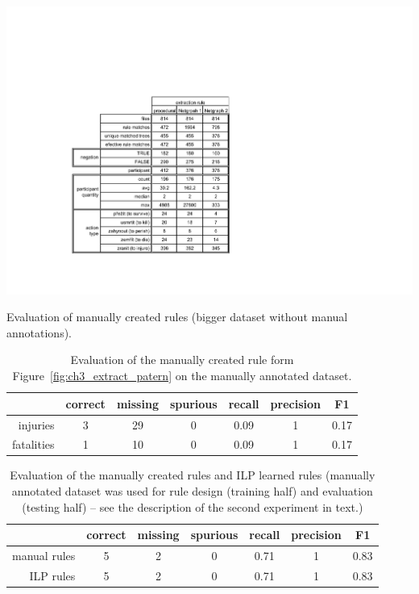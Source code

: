 \begin{table}
	\centering
		\includegraphics[angle=-90,width=0.6\hsize]{../img/ch3_tab_manual_rules}
	\caption{Evaluation of manually created rules (bigger dataset without manual annotations).}
	\label{tab:ch3_tab_manual_rules}
\end{table}



\begin{table}
	\centering
	\begin{tabular}{|r|c|c|c|c|c|c|}
		\hline
		 & correct & missing & spurious & recall & precision & F1\\
		\hline
		injuries & 3 & 29 & 0 & 0.09 & 1 & 0.17\\
		\hline
		fatalities & 1 & 10 & 0 & 0.09 & 1 & 0.17\\
		\hline
	\end{tabular}
	\caption{Evaluation of the manually created rule form Figure~\ref{fig:ch3_extract_patern} on the manually annotated dataset.}
	\label{tab:ch3_extract_patern_eval}
\end{table}



\begin{table}
	\centering
	\begin{tabular}{|r|c|c|c|c|c|c|}
		\hline
		 & correct & missing & spurious & recall & precision & F1\\
		\hline
		manual rules & 5 & 2 & 0 & 0.71 & 1 & 0.83\\
		\hline
		ILP rules & 5 & 2 & 0 & 0.71 & 1 & 0.83\\
		\hline
	\end{tabular}
	\caption{Evaluation of the manually created rules and ILP learned rules (manually annotated dataset was used for rule design (training half) and evaluation (testing half) -- see the description of the second experiment in text.)}
	\label{tab:ch3_damage_manual_eval}
\end{table}






